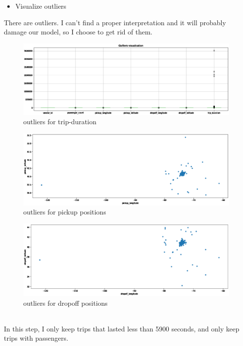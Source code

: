 \begin{itemize}
\item Visualize outliers
\end{itemize}
There are outliers. I can’t find a proper interpretation and it will probably damage our model, so I choose to get rid of them.
\begin{figure}[h]
	\centering
	\includegraphics[scale=0.3]{outliers1.eps}
	\caption{outliers for trip-duration}
\end{figure}
\begin{figure}[h]
	\centering
	\includegraphics[scale=0.3]{outliers2.eps}
	\caption{outliers for pickup positions}
\end{figure}
\begin{figure}[h]
	\centering
	\includegraphics[scale=0.3]{outliers3.eps}
	\caption{outliers for  dropoff positions}
\end{figure}
\vspace{5cm}\\
In this step, I only keep trips that lasted less than 5900 seconds, and only keep trips with passengers.
%
%



